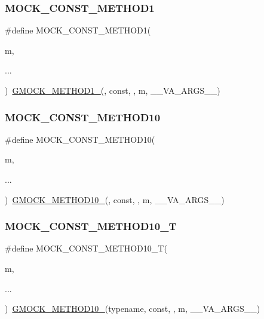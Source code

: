 \subsubsection{\texorpdfstring{MOCK\_CONST\_METHOD1}{MOCK\_CONST\_METHOD1}}
{\footnotesize\ttfamily \#define M\+O\+C\+K\+\_\+\+C\+O\+N\+S\+T\+\_\+\+M\+E\+T\+H\+O\+D1(\begin{DoxyParamCaption}\item[{}]{m,  }\item[{}]{... }\end{DoxyParamCaption})~\mbox{\hyperlink{gmock-generated-function-mockers_8h_a1bc0012d62440dda77208dabdf4925c9}{G\+M\+O\+C\+K\+\_\+\+M\+E\+T\+H\+O\+D1\+\_\+}}(, const, , m, \+\_\+\+\_\+\+V\+A\+\_\+\+A\+R\+G\+S\+\_\+\+\_\+)}

\mbox{\label{gmock-generated-function-mockers_8h_a4f16ede0ef660fb6dc49e5f5d226fbf9}} 
\subsubsection{\texorpdfstring{MOCK\_CONST\_METHOD10}{MOCK\_CONST\_METHOD10}}
{\footnotesize\ttfamily \#define M\+O\+C\+K\+\_\+\+C\+O\+N\+S\+T\+\_\+\+M\+E\+T\+H\+O\+D10(\begin{DoxyParamCaption}\item[{}]{m,  }\item[{}]{... }\end{DoxyParamCaption})~\mbox{\hyperlink{gmock-generated-function-mockers_8h_a81a48223a8771de36ef92ac6d56f6e81}{G\+M\+O\+C\+K\+\_\+\+M\+E\+T\+H\+O\+D10\+\_\+}}(, const, , m, \+\_\+\+\_\+\+V\+A\+\_\+\+A\+R\+G\+S\+\_\+\+\_\+)}

\mbox{\label{gmock-generated-function-mockers_8h_aa31d758cb898bad2d16ac706c204da7f}} 
\subsubsection{\texorpdfstring{MOCK\_CONST\_METHOD10\_T}{MOCK\_CONST\_METHOD10\_T}}
{\footnotesize\ttfamily \#define M\+O\+C\+K\+\_\+\+C\+O\+N\+S\+T\+\_\+\+M\+E\+T\+H\+O\+D10\+\_\+T(\begin{DoxyParamCaption}\item[{}]{m,  }\item[{}]{... }\end{DoxyParamCaption})~\mbox{\hyperlink{gmock-generated-function-mockers_8h_a81a48223a8771de36ef92ac6d56f6e81}{G\+M\+O\+C\+K\+\_\+\+M\+E\+T\+H\+O\+D10\+\_\+}}(typename, const, , m, \+\_\+\+\_\+\+V\+A\+\_\+\+A\+R\+G\+S\+\_\+\+\_\+)}

